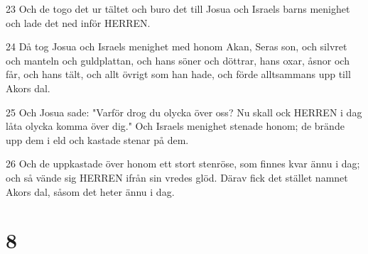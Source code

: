 \par 23 Och de togo det ur tältet och buro det till Josua och Israels barns menighet och lade det ned inför HERREN.
\par 24 Då tog Josua och Israels menighet med honom Akan, Seras son, och silvret och manteln och guldplattan, och hans söner och döttrar, hans oxar, åsnor och får, och hans tält, och allt övrigt som han hade, och förde alltsammans upp till Akors dal.
\par 25 Och Josua sade: "Varför drog du olycka över oss? Nu skall ock HERREN i dag låta olycka komma över dig." Och Israels menighet stenade honom; de brände upp dem i eld och kastade stenar på dem.
\par 26 Och de uppkastade över honom ett stort stenröse, som finnes kvar ännu i dag; och så vände sig HERREN ifrån sin vredes glöd. Därav fick det stället namnet Akors dal, såsom det heter ännu i dag.

\chapter{8}

